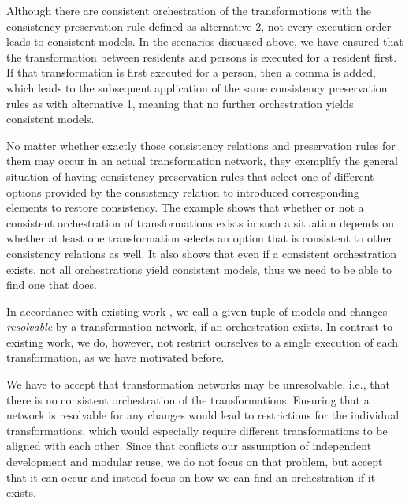 Although there are consistent orchestration of the transformations with the consistency preservation rule defined as alternative 2, not every execution order leads to consistent models.
In the scenarios discussed above, we have ensured that the transformation between residents and persons is executed for a resident first.
If that transformation is first executed for a person, then a comma is added, which leads to the subsequent application of the same consistency preservation rules as with alternative 1, meaning that no further orchestration yields consistent models.

No matter whether exactly those consistency relations and preservation rules for them may occur in an actual transformation network, they exemplify the general situation of having consistency preservation rules that select one of different options provided by the consistency relation to introduced corresponding elements to restore consistency.
The example shows that whether or not a consistent orchestration of transformations exists in such a situation depends on whether at least one transformation selects an option that is consistent to other consistency relations as well.
It also shows that even if a consistent orchestration exists, not all orchestrations yield consistent models, thus we need to be able to find one that does.

In accordance with existing work \cite{stevens2020BidirectionalTransformationLarge-SoSym}, we call a given tuple of models and changes \emph{resolvable} by a transformation network, if an orchestration exists.
In contrast to existing work, we do, however, not restrict ourselves to a single execution of each transformation, as we have motivated before.

We have to accept that transformation networks may be unresolvable, i.e., that there is no consistent orchestration of the transformations.
Ensuring that a network is resolvable for any changes would lead to restrictions for the individual transformations, which would especially require different transformations to be aligned with each other.
Since that conflicts our assumption of independent development and modular reuse, we do not focus on that problem, but accept that it can occur and instead focus on how we can find an orchestration if it exists. 

